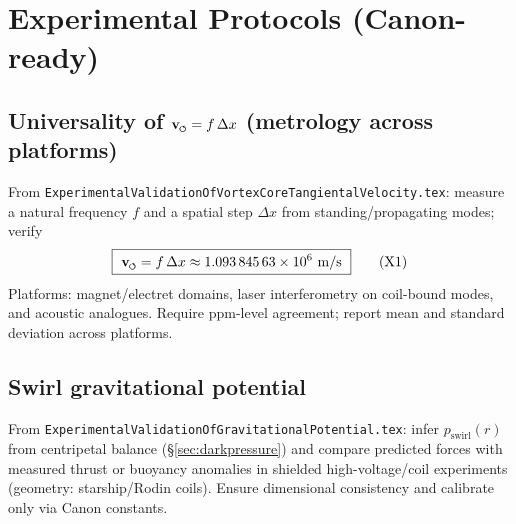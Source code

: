 \documentclass[11pt]{article}
\begin{document}
\section{Experimental Protocols (Canon-ready)}
    \label{sec:experiments}

\subsection*{Universality of $\vswirl = f\,\Delta x$ (metrology across platforms)}
    From \texttt{ExperimentalValidationOfVortexCoreTangientalVelocity.tex}: measure a natural frequency $f$ and a spatial step $\Delta x$ from standing/propagating modes; verify
        \begin{equation}
            \boxed{\ \vswirl = f\,\Delta x \approx \num{1.09384563e6}\ \si{m/s}\ } \tag{X1}
        \end{equation}
        Platforms: magnet/electret domains, laser interferometry on coil-bound modes, and acoustic analogues. Require ppm-level agreement; report mean and standard deviation across platforms.

\subsection*{Swirl gravitational potential}
From \texttt{ExperimentalValidationOfGravitationalPotential.tex}: infer $p_{\text{swirl}}(r)$ from centripetal balance (\S\ref{sec:darkpressure}) and compare predicted forces with measured thrust or buoyancy anomalies in shielded high-voltage/coil experiments (geometry: starship/Rodin coils). Ensure dimensional consistency and calibrate only via Canon constants.


    \nocite{*}
    
    
\end{document}
